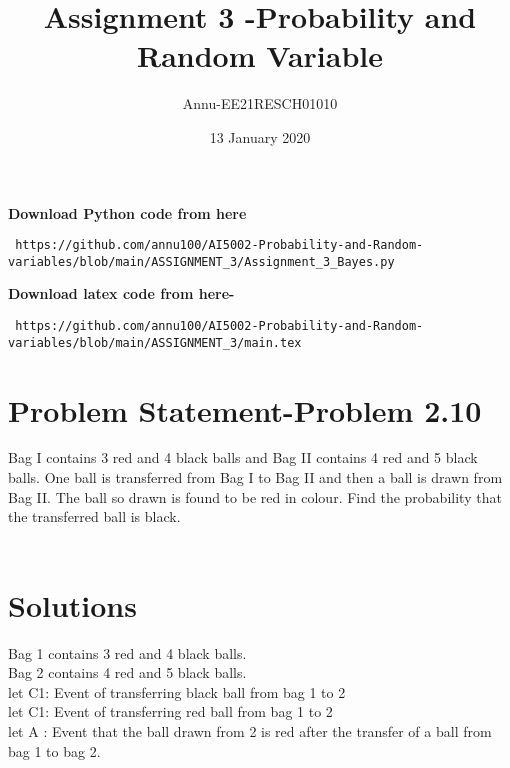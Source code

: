 \documentclass[journel,12pt,twocoloums]{IEEEtran}
\title{Assignment 3 -Probability and Random Variable}
\author{Annu-EE21RESCH01010}
\date{13 January 2020}
\begin{document}
 \maketitle
 \textbf{Download Python code from here}\\
\begin{lstlisting}
 https://github.com/annu100/AI5002-Probability-and-Random-variables/blob/main/ASSIGNMENT_3/Assignment_3_Bayes.py
 \end{lstlisting}
\textbf{Download latex code from here-}\\
\begin{lstlisting}
 https://github.com/annu100/AI5002-Probability-and-Random-variables/blob/main/ASSIGNMENT_3/main.tex
 \end{lstlisting}
 \section{Problem Statement-Problem 2.10}
Bag I contains 3 red and 4 black balls and
Bag II contains 4 red and 5 black balls. One
ball is transferred from Bag I to Bag II and
then a ball is drawn from Bag II. The ball
so drawn is found to be red in colour. Find
the probability that the transferred ball is black.
\\
\\
\section{Solutions}
Bag 1 contains 3 red and 4 black balls.\\
Bag 2 contains 4 red and 5 black balls.\\

let  C1: Event of transferring black ball from bag 1 to 2\\
let  C1: Event of transferring red ball from bag 1 to 2\\
let A : Event that the ball drawn from 2 is red after the transfer of a ball from bag 1 to bag 2.\\
\\
\\
\\
\\
\\
\\
\\
\end{document}
